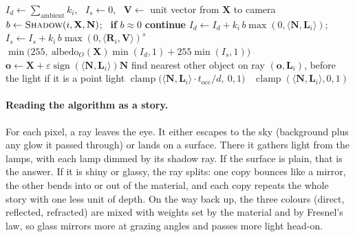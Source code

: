 \documentclass[11pt,a4paper]{article}
\newcommand{\vv}[1]{\mathbf{#1}}
\newcommand{\dotp}[2]{\langle #1, #2\rangle}
\begin{document}
\begin{algorithm}[t]
\caption{The complete ray tracer, continued: lighting at a hit}
\label{alg:full2}
\begin{algorithmic}[1]
\Function{Direct}{$\vv X,\vv N,O$}
  \State $I_d\gets\sum_{\text{ambient}}k_i$, \ $I_s\gets0$, \ $\vv V\gets$ unit vector from $\vv X$ to camera
     \State $b\gets\textsc{Shadow}(i,\vv X,\vv N)$; \ \textbf{if} $b\approx0$ \textbf{continue}
     \State $I_d\gets I_d+k_i\,b\max(0,\dotp{\vv N}{\vv L_i})$; \ $I_s\gets I_s+k_i\,b\max(0,\dotp{\vv R_i}{\vv V})^{s}$
  \EndFor
  \State \Return $\min\big(255,\ \text{albedo}_O(\vv X)\min(I_d,1)+255\min(I_s,1)\big)$
\EndFunction
\Statex
\Function{Shadow}{light $i$, $\vv X,\vv N$}
  \State $\vv o\gets\vv X+\varepsilon\operatorname{sign}(\dotp{\vv N}{\vv L_i})\vv N$
  \State find nearest other object on ray $(\vv o,\vv L_i)$, before the light if it is a point light
    \EndIf
   \Return $\operatorname{clamp}\big(\dotp{\vv N}{\vv L_i}\cdot t_{\text{occ}}/d,\ 0,1\big)$
  \Else\ \Return $\operatorname{clamp}(\dotp{\vv N}{\vv L_i},0,1)$
  \EndIf
\EndFunction
\end{algorithmic}
\end{algorithm}

\paragraph{Reading the algorithm as a story.} For each pixel, a ray leaves the
eye. It either escapes to the sky (background plus any glow it passed through)
or lands on a surface. There it gathers light from the lamps, with each lamp
dimmed by its shadow ray. If the surface is plain, that is the answer. If it is
shiny or glassy, the ray splits: one copy bounces like a mirror, the other bends
into or out of the material, and each copy repeats the whole story with one less
unit of depth. On the way back up, the three colours (direct, reflected,
refracted) are mixed with weights set by the material and by Fresnel's law, so
glass mirrors more at grazing angles and passes more light head-on.
\end{document}
